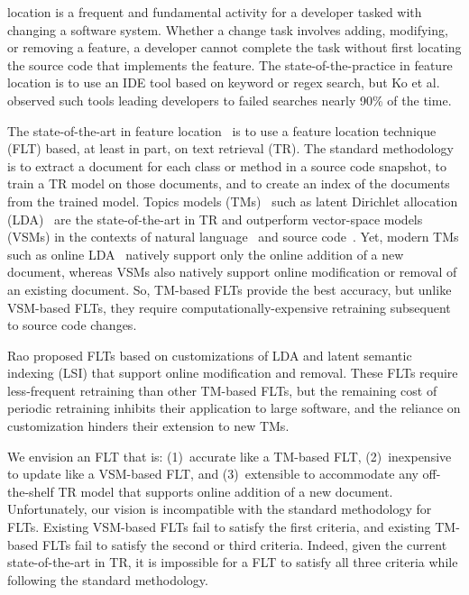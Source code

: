 
 location is a frequent and fundamental activity for a developer tasked with changing a software system.
Whether a change task involves adding, modifying, or removing a feature, a developer cannot complete the task without first locating the source code that implements the feature.
The state-of-the-practice in feature location is to use an IDE tool based on keyword or regex search, but Ko et al.~\cite{Ko-etal:2006} observed such tools leading developers to failed searches nearly 90\% of the time.

The state-of-the-art in feature location~\cite{Dit-etal:2011} is to use a feature location technique (FLT) based, at least in part, on text retrieval (TR).
The standard methodology~\cite{Marcus-etal:2004} is to extract a document for each class or method in a source code snapshot, to train a TR model on those documents, and to create an index of the documents from the trained model.
Topics models (TMs)~\cite{Blei:2012} such as latent Dirichlet allocation (LDA)~\cite{Blei-etal:2003} are the state-of-the-art in TR and outperform vector-space models (VSMs) in the contexts of natural language~\cite{Deerwester-etal:1990,Blei-etal:2003} and source code~\cite{Poshyvanyk-etal:2007,Lukins-etal:2010}.
Yet, modern TMs such as online LDA~\cite{Hoffman-etal:2010} natively support only the online addition of a new document, whereas VSMs also natively support online modification or removal of an existing document.
So, TM-based FLTs provide the best accuracy, but unlike VSM-based FLTs, they require computationally-expensive retraining subsequent to source code changes.

Rao\cite{Rao:2013} proposed FLTs based on customizations of LDA and latent semantic indexing (LSI) that support online modification and removal.
These FLTs require less-frequent retraining than other TM-based FLTs,
but the remaining cost of periodic retraining inhibits their application to large software, and the reliance on customization hinders their extension to new TMs.

We envision an FLT that is: (1)~accurate like a TM-based FLT, (2)~inexpensive to update like a VSM-based FLT, and (3)~extensible to accommodate any off-the-shelf TR model that supports online addition of a new document.
Unfortunately, our vision is incompatible with the standard methodology for FLTs.
Existing VSM-based FLTs fail to satisfy the first criteria, and existing TM-based FLTs fail to satisfy the second or third criteria.
Indeed, given the current state-of-the-art in TR, it is impossible for a FLT to satisfy all three criteria while following the standard methodology.

